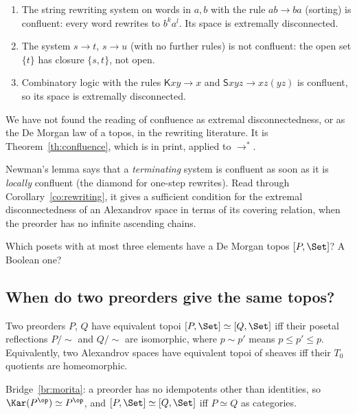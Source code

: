 \begin{example}
\begin{enumerate}
\item The string rewriting system on words in $a,b$ with the rule $ab\to ba$ (sorting) is confluent: every word rewrites to $b^ka^l$. Its space is extremally disconnected.
\item The system $s\to t$, $s\to u$ (with no further rules) is not confluent: the open set $\{t\}$ has closure $\{s,t\}$, not open.
\item Combinatory logic with the rules $\mathsf Kxy\to x$ and $\mathsf Sxyz\to xz(yz)$ is confluent, so its space is extremally disconnected.
\end{enumerate}
\end{example}

\status{} We have not found the reading of confluence as extremal disconnectedness, or as the De Morgan law of a topos, in the rewriting literature. It is Theorem~\ref{th:confluence}, which is in print, applied to $\to^*$.

\begin{remark}
Newman's lemma says that a \emph{terminating} system is confluent as soon as it is \emph{locally} confluent (the diamond for one-step rewrites). Read through Corollary~\ref{co:rewriting}, it gives a sufficient condition for the extremal disconnectedness of an Alexandrov space in terms of its covering relation, when the preorder has no infinite ascending chains.
\end{remark}

\begin{exercise}\label{exo:finiteposets}
Which posets with at most three elements have a De Morgan topos $[P,\Set]$? A Boolean one?
\end{exercise}

\subsection{When do two preorders give the same topos?}

\begin{theorem}\label{th:moritapre}
Two preorders $P$, $Q$ have equivalent topoi $[P,\Set]\simeq[Q,\Set]$ iff their posetal reflections $P/{\sim}$ and $Q/{\sim}$ are isomorphic, where $p\sim p'$ means $p\le p'\le p$. Equivalently, two Alexandrov spaces have equivalent topoi of sheaves iff their $T_0$ quotients are homeomorphic.
\end{theorem}

\gen{} Bridge~\ref{br:morita}: a preorder has no idempotents other than identities, so $\Kar(P^{\op})\simeq P^{\op}$, and $[P,\Set]\simeq[Q,\Set]$ iff $P\simeq Q$ as categories.

